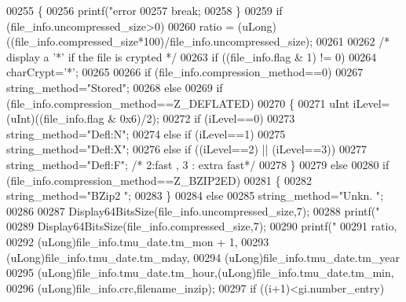\begin{DoxyCode}
{{{{00255         \{
00256             printf(\textcolor{stringliteral}{"error %
00257             \textcolor{keywordflow}{break};
00258         \}
00259         \textcolor{keywordflow}{if} (file\_info.uncompressed\_size>0)
00260             ratio = (uLong)((file\_info.compressed\_size*100)/file\_info.uncompressed\_size);
00261 
00262         \textcolor{comment}{/* display a '*' if the file is crypted */}
00263         \textcolor{keywordflow}{if} ((file\_info.flag & 1) != 0)
00264             charCrypt=\textcolor{charliteral}{'*'};
00265 
00266         \textcolor{keywordflow}{if} (file\_info.compression\_method==0)
00267             string\_method=\textcolor{stringliteral}{"Stored"};
00268         \textcolor{keywordflow}{else}
00269         \textcolor{keywordflow}{if} (file\_info.compression\_method==Z\_DEFLATED)
00270         \{
00271             uInt iLevel=(uInt)((file\_info.flag & 0x6)/2);
00272             \textcolor{keywordflow}{if} (iLevel==0)
00273               string\_method=\textcolor{stringliteral}{"Defl:N"};
00274             \textcolor{keywordflow}{else} \textcolor{keywordflow}{if} (iLevel==1)
00275               string\_method=\textcolor{stringliteral}{"Defl:X"};
00276             \textcolor{keywordflow}{else} \textcolor{keywordflow}{if} ((iLevel==2) || (iLevel==3))
00277               string\_method=\textcolor{stringliteral}{"Defl:F"}; \textcolor{comment}{/* 2:fast , 3 : extra fast*/}
00278         \}
00279         \textcolor{keywordflow}{else}
00280         \textcolor{keywordflow}{if} (file\_info.compression\_method==Z\_BZIP2ED)
00281         \{
00282               string\_method=\textcolor{stringliteral}{"BZip2 "};
00283         \}
00284         \textcolor{keywordflow}{else}
00285             string\_method=\textcolor{stringliteral}{"Unkn. "};
00286 
00287         Display64BitsSize(file\_info.uncompressed\_size,7);
00288         printf(\textcolor{stringliteral}{"  %
00289         Display64BitsSize(file\_info.compressed\_size,7);
00290         printf(\textcolor{stringliteral}{" %
00291                 ratio,
00292                 (uLong)file\_info.tmu\_date.tm\_mon + 1,
00293                 (uLong)file\_info.tmu\_date.tm\_mday,
00294                 (uLong)file\_info.tmu\_date.tm\_year %
00295                 (uLong)file\_info.tmu\_date.tm\_hour,(uLong)file\_info.tmu\_date.tm\_min,
00296                 (uLong)file\_info.crc,filename\_inzip);
00297         \textcolor{keywordflow}{if} ((i+1)<gi.number\_entry)
}}}}}}}
\end{DoxyCode}
